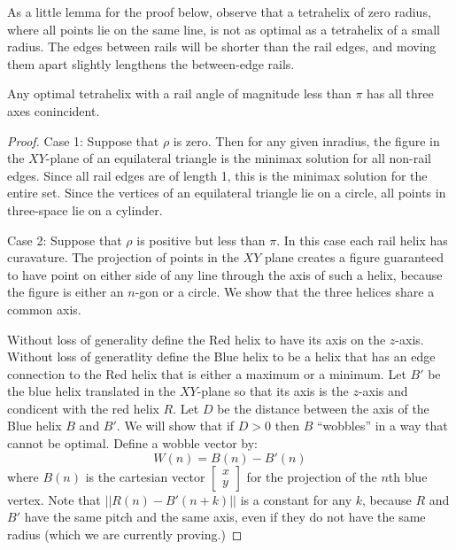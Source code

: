 \documentclass[review]{siamonline1116}
\begin{document}
As a little lemma for the proof below, observe that a tetrahelix of zero radius, where
all points lie on the same line,
is not as optimal as a tetrahelix of a small radius. The edges between rails will be
shorter than the rail edges, and moving them apart slightly lengthens the between-edge
rails.

\begin{theorem}
  Any optimal tetrahelix with a rail angle of magnitude less than $\pi$ has all three
  axes conincident.
  \label{thm:conincident}
\end{theorem}
\begin{proof}
  Case 1: Suppose that $\rho$ is zero. Then for any given inradius, the
  figure in the $XY$-plane of an equilateral
  triangle is the minimax solution for all non-rail edges. Since all
  rail edges are of length 1, this is the minimax solution for the entire set. Since
the vertices of an equilateral triangle lie on a circle, all points in three-space lie on
a cylinder.

Case 2: Suppose that $\rho$ is positive but less than $\pi$.
In this case each rail helix has
curavature. The projection of points in the $XY$ plane creates a figure
guaranteed to have point on either side of any line through the axis of such
a helix, because the figure is either an $n$-gon or a circle.
We show that the three helices share a common axis.

  Without loss of generality define the Red helix to have its axis on the $z$-axis.
  Without loss of generatlity define the Blue helix to be a helix that
  has an edge connection to the Red helix that is either a maximum or a minimum.
  Let $B'$ be the blue helix translated in the $XY$-plane so that its axis is the $z$-axis and
  condicent with the red helix $R$. Let $D$ be the distance between the axis of the Blue helix
  $B$ and $B'$. We will show that if $D>0$ then $B$ ``wobbles'' in a way that cannot be optimal.
  Define a wobble vector by:
  \begin{equation*}
    W(n) = B(n) - B'(n)
  \end{equation*}
  where $B(n)$ is the cartesian vector
  $\begin{bmatrix}
           x \\
           y 
  \end{bmatrix}$
  for the projection of the $n$th blue vertex.
  Note that $|| R(n) - B'(n+k)||$ is a constant for any $k$, because $R$ and $B'$ have the
  same pitch and the same axis, even if they do not have the same radius
  (which we are currently proving.)


\end{proof}
\end{document}
